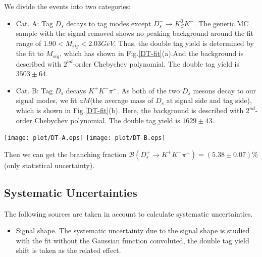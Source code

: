 {    We divide the events into two categories:

    \begin{itemize}
        \item[-] Cat. A: Tag $D_{s}$ decays to tag modes except $D_{s}^{-} \rightarrow K_{S}^{0}K^{-}$. The generic MC sample with the signal removed shows no peaking background around the fit range of $1.90 < M_{sig} < 2.03 GeV$.
            Thus, the double tag yield is determined by the fit to $M_{sig}$, which has shown in Fig.\ref{DT-fit}(a).And the background is described with $2^{nd}$-order Chebychev polynomial. The double tag yield is $3503\pm64$. 
        \item[-] Cat. B: Tag $D_{s}$ decays $K^{+}K^{-}\pi^{+}$. As both of the two $D_{s}$ mesons decay to our signal modes, we fit $aM$(the average mass of $D_{s}$ at signal side and tag side), which is shown in Fig.\ref{DT-fit}(b). 
            Here, the background is described with $2^{nd}$-order Chebychev polynomial. The double tag yield is $1629\pm43$. 
    \end{itemize}

    \begin{figure*}[!htbp]
        \centering
        \texttt{[image: plot/DT-A.eps]}
        \texttt{[image: plot/DT-B.eps]}
        \caption{Fit of (a)Cat. A and (b)Cat. B.
            We fit $M_{sig}$ and $aM$ for Cat. A and Cat. B, respectively. The signal shapes are the corresponding simulated shapes convoluted with a Gaussian function and 
        the background shapes are described with $2^{nd}$-order Chebychev polynomial.}
        \label{DT-fit}
    \end{figure*}



    Then we can get the branching fraction $\mathcal{B}(D_{s}^{+} \rightarrow K^{+}K^{-}\pi^{+})=(5.38\pm0.07)\%$(only statistical uncertainty).

    \subsection{Systematic Uncertainties}
    The following sources are taken in account to calculate systematic uncertainties.

    \begin{itemize}
        \item Signal shape. The systematic uncertainty due to the signal shape is studied with the fit without the Gaussian function convoluted, the double tag yield shift is taken as the related effect. 


\end{itemize}}
